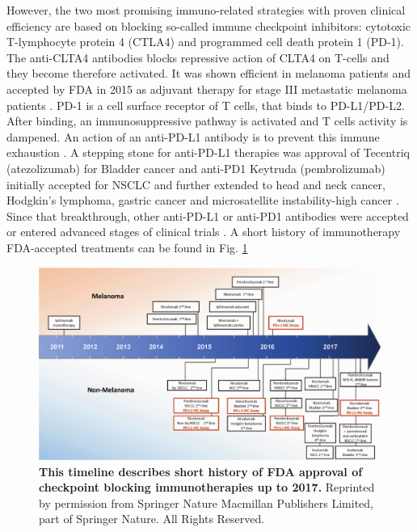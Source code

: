 \documentclass[12pt,]{book}
\theoremstyle{definition}
\theoremstyle{definition}
\theoremstyle{definition}
\theoremstyle{remark}
\begin{document}
However, the two most promising immuno-related strategies with proven
clinical efficiency are based on blocking so-called immune checkpoint
inhibitors: cytotoxic T-lymphocyte protein 4 (CTLA4) and programmed cell
death protein 1 (PD-1). The anti-CLTA4 antibodies blocks repressive
action of CLTA4 on T-cells and they become therefore activated. It was
shown efficient in melanoma patients and accepted by FDA in 2015 as
adjuvant therapy for stage III metastatic melanoma patients
\citep{FDACTLA4}. PD-1 is a cell surface receptor of T cells, that binds
to PD-L1/PD-L2. After binding, an immunosuppressive pathway is activated
and T cells activity is dampened. An action of an anti-PD-L1 antibody is
to prevent this immune exhaustion \citep{Chen2017}. A stepping stone for
anti-PD-L1 therapies was approval of Tecentriq (atezolizumab) for
Bladder cancer \citep{FDAPDL1Bladder} and anti-PD1 Keytruda
(pembrolizumab) initially accepted for NSCLC and further extended to
head and neck cancer, Hodgkin's lymphoma, gastric cancer and
microsatellite instability-high cancer \citep{FDAPDL1NSCLC}. Since that
breakthrough, other anti-PD-L1 or anti-PD1 antibodies were accepted or
entered advanced stages of clinical trials \citep{Wolchok2015}. A short
history of immunotherapy FDA-accepted treatments can be found in Fig.
\ref{fig:timeline-immunotherapies}

\begin{figure}

{\centering \includegraphics[width=1\linewidth]{figures-ext/02-timeline-immunotherapies} 

}

\caption[This timeline describes short history of FDA approval of checkpoint blocking immunotherapies up to 2017.]{\textbf{This timeline describes
short history of FDA approval of checkpoint blocking immunotherapies up
to 2017.} Reprinted by permission from Springer Nature
\citep{Taube2017a} Macmillan Publishers Limited, part of Springer
Nature. All Rights Reserved.}\label{fig:timeline-immunotherapies}
\end{figure}
\end{document}
